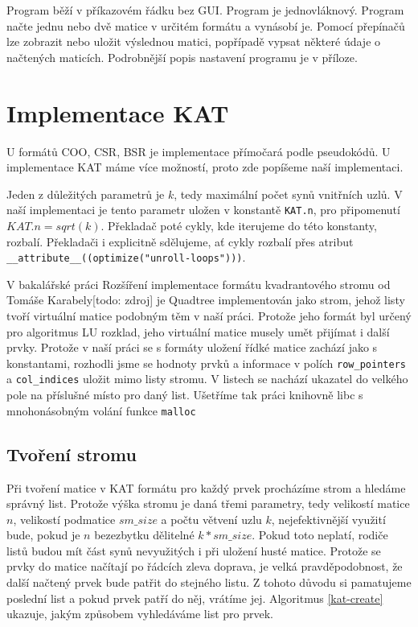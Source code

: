 Program běží v příkazovém řádku bez GUI. Program je jednovláknový. Program načte jednu nebo dvě matice v určitém formátu a vynásobí je. Pomocí přepínačů lze zobrazit nebo uložit výslednou matici, popřípadě vypsat některé údaje o načtených maticích. Podrobnější popis nastavení programu je v příloze.


\section{Implementace KAT}

U formátů COO, CSR, BSR je implementace přímočará podle pseudokódů. U implementace KAT máme více možností, proto zde popíšeme naší implementaci.

Jeden z důležitých parametrů je $k$, tedy maximální počet synů vnitřních uzlů. V naší implementaci je tento parametr uložen v konstantě \texttt{KAT.n}, pro připomenutí $KAT.n = sqrt(k)$. Překladač poté cykly, kde iterujeme do této konstanty, rozbalí. Překladači i explicitně sdělujeme, ať cykly rozbalí přes atribut \texttt{\_\_attribute\_\_((optimize("unroll-loops")))}.

V bakalářské práci Rozšíření implementace formátu kvadrantového stromu od Tomáše Karabely[todo: zdroj] je Quadtree implementován jako strom, jehož listy tvoří virtuální matice podobným těm v naší práci. Protože jeho formát byl určený pro algoritmus LU rozklad, jeho virtuální matice musely umět přijímat i další prvky. Protože v naší práci se s formáty uložení řídké matice zachází jako s konstantami, rozhodli jsme se hodnoty prvků a informace v polích \texttt{row\_pointers} a \texttt{col\_indices} uložit mimo listy stromu. V listech se nachází ukazatel do velkého pole na příslušné místo pro daný list. Ušetříme tak práci knihovně libc s mnohonásobným volání funkce \texttt{malloc}

\subsection{Tvoření stromu}

Při tvoření matice v KAT formátu pro každý prvek procházíme strom a hledáme správný list. Protože výška stromu je daná třemi parametry, tedy velikostí matice $n$, velikostí podmatice $sm\_size$ a počtu větvení uzlu $k$, nejefektivnější využití bude, pokud je $n$ bezezbytku dělitelné $k * sm\_size$. Pokud toto neplatí, rodiče listů budou mít část synů nevyužitých i při uložení husté matice. Protože se prvky do matice načítají po řádcích zleva doprava, je velká pravděpodobnost, že další načtený prvek bude patřit do stejného listu. Z tohoto důvodu si pamatujeme poslední list a pokud prvek patří do něj, vrátíme jej. Algoritmus \ref{kat-create} ukazuje, jakým způsobem vyhledáváme list pro prvek.


